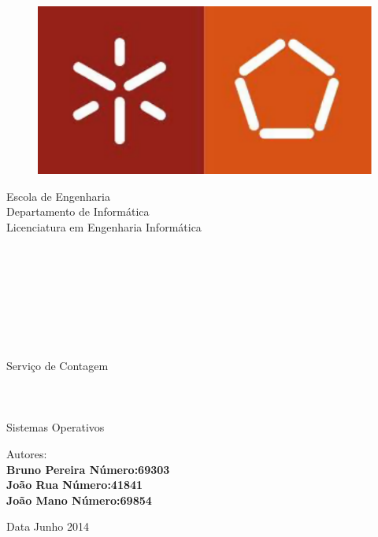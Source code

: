 \documentclass[10pt,notitlepage]{article}
\begin{document}
\begin{titlepage}

\begin{center}


\begin{figure}
\centering
\includegraphics[scale=0.5]{logo.pdf}
\end{figure}





Escola de Engenharia \\  Departamento de Informática \\ Licenciatura em Engenharia Informática \\~\\~  \\~ \\~ \\~ \\~ \\~ \\~ \\




{\Huge Serviço de Contagem}
\\~ \\~ \\~ \\
Sistemas Operativos
  \vfill





\vspace{1.5cm}
 \begin{flushleft}  Autores: \\
 \textbf{Bruno Pereira\hspace{35pt} Número:69303\\João Rua \hspace{55pt}   Número:41841\\João Mano \hspace{48pt}           Número:69854\\}
\end{flushleft}

 \vspace{0.8cm}
 Data Junho 2014
\end{center}

\end{titlepage}
\end{document}
